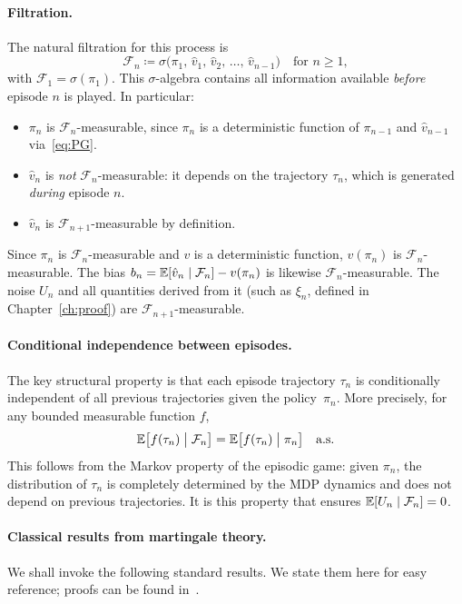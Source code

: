 \documentclass[a4paper,oneside,11pt]{report}
\newcommand{\calF}{\mathcal{F}}
\numberwithin{theorem}{chapter}
\numberwithin{equation}{chapter}
\begin{document}
\paragraph{Filtration.}
The natural filtration for this process is
\begin{equation}
  \label{eq:filtration}
  \calF_n \coloneqq \sigma\bigl(\pi_1,\, \hat v_1,\, \hat v_2,\,
  \ldots,\, \hat v_{n-1}\bigr)
  \quad \text{for } n \ge 1,
\end{equation}
with $\calF_1 = \sigma(\pi_1)$. This $\sigma$-algebra contains all
information available \emph{before} episode $n$ is played. In
particular:
\begin{itemize}
\item $\pi_n$ is $\calF_n$-measurable, since $\pi_n$ is a deterministic
  function of $\pi_{n-1}$ and $\hat v_{n-1}$ via~\eqref{eq:PG}.
\item $\hat v_n$ is \emph{not} $\calF_n$-measurable: it depends on the
  trajectory $\tau_n$, which is generated \emph{during} episode $n$.
\item $\hat v_n$ is $\calF_{n+1}$-measurable by definition.
\end{itemize}

Since $\pi_n$ is $\calF_n$-measurable and $v$ is a deterministic
function, $v(\pi_n)$ is $\calF_n$-measurable. The bias
$b_n = \E[\hat v_n \mid \calF_n] - v(\pi_n)$ is likewise
$\calF_n$-measurable. The noise $U_n$ and all quantities derived from
it (such as $\xi_n$, defined in Chapter~\ref{ch:proof}) are
$\calF_{n+1}$-measurable.

\paragraph{Conditional independence between episodes.}
The key structural property is that each episode trajectory $\tau_n$ is
conditionally independent of all previous trajectories given the
policy~$\pi_n$. More precisely, for any bounded measurable function
$f$,
\begin{equation}
  \label{eq:cond-ind}
  \E\bigl[f(\tau_n) \bigm| \calF_n\bigr]
  = \E\bigl[f(\tau_n) \bigm| \pi_n\bigr]
  \quad \text{a.s.}
\end{equation}
This follows from the Markov property of the episodic game: given
$\pi_n$, the distribution of $\tau_n$ is completely determined by the
MDP dynamics and does not depend on previous trajectories. It is this
property that ensures $\E[U_n \mid \calF_n] = 0$.

\paragraph{Classical results from martingale theory.}
We shall invoke the following standard results. We state them here for
easy reference; proofs can be found
in~\cite{williams1991,durrett2019,hall1980}.
\end{document}
